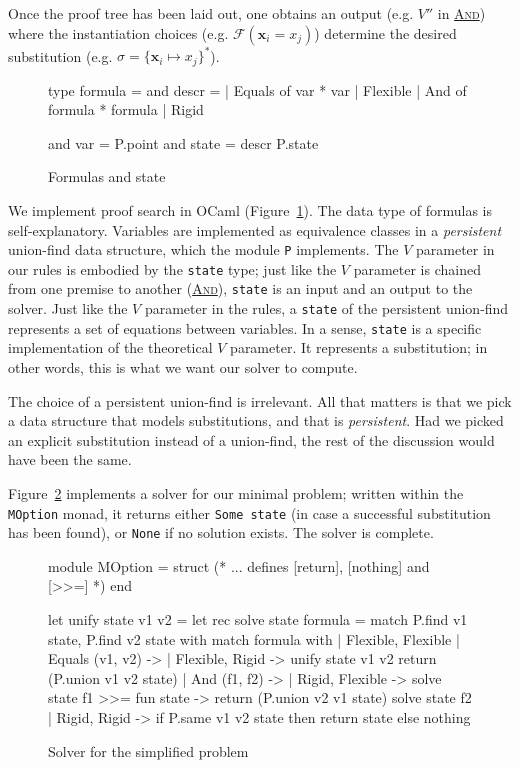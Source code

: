 \documentclass{easychair}
\def\li{\lstinline}
\let\TirName\textsc
\renewcommand{\DefTirName}[1]{\hyperlink{#1}{\TirName {#1}}}
\let\Rule\DefTirName
\newcommand{\fref}[1]{Figure~\ref{fig:#1}}
\newcommand{\f}[1]{\ensuremath{\mathbf{#1}}} %
\newcommand{\F}{\ensuremath{\mathcal{F}}} %
\begin{document}
Once the proof tree has been laid out, one obtains an output (e.g. $V''$ in
\Rule{And}) where the instantiation choices (e.g. $\F (\f x_i = x_j)$) determine
the desired substitution (e.g. $\sigma = \{ \f x_i \mapsto x_j \}^*$).

\begin{figure}
  \centering
  \begin{ocaml}
type formula =                and descr =
| Equals of var * var           | Flexible
| And of formula * formula      | Rigid

and var = P.point             and state = descr P.state
  \end{ocaml}
  \caption{Formulas and state}
  \label{fig:formulas}
\end{figure}

We implement proof search in OCaml (\fref{formulas}). The data type of formulas
is self-explanatory. Variables are implemented as equivalence classes in a
\emph{persistent} union-find data structure, which the module \li+P+ implements.
The $V$ parameter in our rules is embodied by the \li+state+ type; just
like the $V$ parameter is chained from one premise to another (\Rule{And}),
\li+state+ is an input and an output to the solver. Just like the $V$ parameter
in the rules, a \li+state+ of the persistent union-find represents
a set of equations between variables. In a sense, \li+state+ is a specific
implementation of the theoretical $V$ parameter. It represents a
substitution; in other words, this is what we want our solver to compute.

The choice of a persistent union-find is irrelevant. All that matters is that we
pick a data structure that models substitutions, and that is \emph{persistent}.
Had we picked an explicit substitution instead of a union-find, the rest of the
discussion would have been the same.

\fref{solver} implements a solver for our minimal problem; written within the
\li+MOption+ monad, it returns either \li+Some state+ (in case a successful
substitution has been found), or \li+None+ if no solution exists. The solver is
complete.

\begin{figure}
  \centering
  \begin{ocaml}
module MOption = struct
  (* ... defines [return], [nothing] and [>>=] *)
end

let unify state v1 v2 =                         let rec solve state formula =
  match P.find v1 state, P.find v2 state with     match formula with
  | Flexible, Flexible                            | Equals (v1, v2) ->
  | Flexible, Rigid ->                                unify state v1 v2
      return (P.union v1 v2 state)                | And (f1, f2) ->
  | Rigid, Flexible ->                                solve state f1 >>= fun state ->
      return (P.union v2 v1 state)                    solve state f2
  | Rigid, Rigid ->
      if P.same v1 v2 state then
        return state
      else
        nothing
  \end{ocaml}
  \caption{Solver for the simplified problem}
  \label{fig:solver}
\end{figure}
\end{document}
